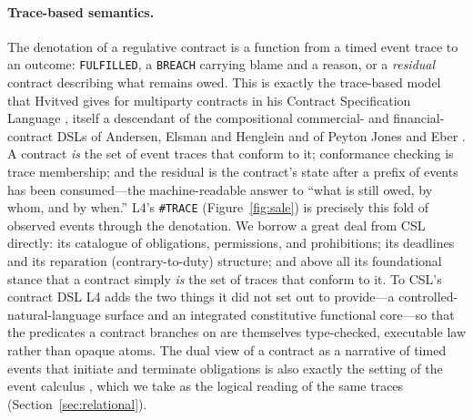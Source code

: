 \documentclass[sigconf,nonacm]{acmart}
\newcommand{\code}[1]{\texttt{\small #1}}
\begin{document}
\paragraph{Trace-based semantics.}
The denotation of a regulative contract is a function from a timed event
trace to an outcome: \code{FULFILLED}, a \code{BREACH} carrying blame and a
reason, or a \emph{residual} contract describing what remains owed. This is
exactly the trace-based model that Hvitved gives for multiparty contracts
in his Contract Specification Language \cite{hvitved2011thesis,
hvitved2012trace}, itself a descendant of the compositional commercial- and
financial-contract DSLs of Andersen, Elsman and Henglein and of Peyton
Jones and Eber \cite{andersen2006compositional, pjeber2000composing}. A
contract \emph{is} the set of event traces that conform to it; conformance
checking is trace membership; and the residual is the contract's state after
a prefix of events has been consumed---the machine-readable answer to ``what
is still owed, by whom, and by when.'' L4's \code{\#TRACE}
(Figure~\ref{fig:sale}) is precisely this fold of observed events through the
denotation. We borrow a great deal from CSL directly: its catalogue of
obligations, permissions, and prohibitions; its deadlines and its
reparation (contrary-to-duty) structure; and above all its foundational
stance that a contract simply \emph{is} the set of traces that conform to
it. To CSL's contract DSL L4 adds the two things it did not set out to
provide---a controlled-natural-language surface and an integrated
constitutive functional core---so that the predicates a contract branches
on are themselves type-checked, executable law rather than opaque
atoms. The dual view of a contract as a narrative of timed events that
initiate and terminate obligations is also exactly the setting of the event
calculus \cite{kowalski1986events}, which we take as the logical reading of
the same traces (Section~\ref{sec:relational}).
\end{document}
